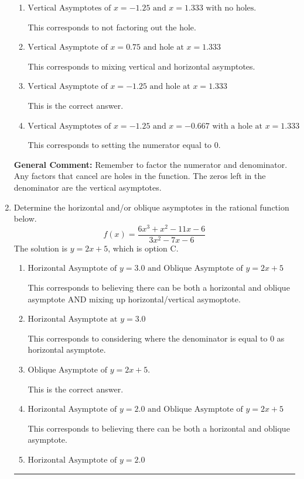 \documentclass{extbook}[14pt]
\newcommand{\litem}[1]{\item #1

\rule{\textwidth}{0.4pt}}
\begin{document}
\begin{enumerate}
{\begin{enumerate}[label=\Alph*.]
This corresponds to considering where the denominator is equal to 0 as holes.
\item \( \text{Vertical Asymptotes of } x = -1.25 \text{ and } x = 1.333 \text{ with no holes.} \)

This corresponds to not factoring out the hole.
\item \( \text{Vertical Asymptote of } x = 0.75 \text{ and hole at } x = 1.333 \)

This corresponds to mixing vertical and horizontal asymptotes.
\item \( \text{Vertical Asymptote of } x = -1.25 \text{ and hole at } x = 1.333 \)

This is the correct answer.
\item \( \text{Vertical Asymptotes of } x = -1.25 \text{ and } x = -0.667 \text{ with a hole at } x = 1.333 \)

This corresponds to setting the numerator equal to 0.
\end{enumerate}

\textbf{General Comment:} Remember to factor the numerator and denominator. Any factors that cancel are holes in the function. The zeros left in the denominator are the vertical asymptotes.
}
\litem{
Determine the horizontal and/or oblique asymptotes in the rational function below.
\[ f(x) = \frac{6x^{3} + x^{2} -11 x -6}{3x^{2} -7 x -6} \]The solution is \( y = 2x + 5 \), which is option C.\begin{enumerate}[label=\Alph*.]
\item \( \text{Horizontal Asymptote of } y = 3.0 \text{ and Oblique Asymptote of } y = 2x + 5 \)

This corresponds to believing there can be both a horizontal and oblique asymptote AND mixing up horizontal/vertical asymoptote.
\item \( \text{Horizontal Asymptote at } y = 3.0 \)

This corresponds to considering where the denominator is equal to 0 as horizontal asymptote.
\item \( \text{Oblique Asymptote of } y = 2x + 5. \)

This is the correct answer.
\item \( \text{Horizontal Asymptote of } y = 2.0 \text{ and Oblique Asymptote of } y = 2x + 5 \)

This corresponds to believing there can be both a horizontal and oblique asymptote.
\item \( \text{Horizontal Asymptote of } y = 2.0  \)


\end{enumerate}}
\end{enumerate}
\end{document}
